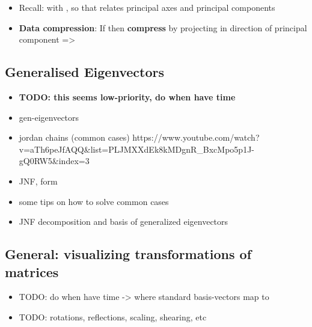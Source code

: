 \begin{itemize}
            \begin{itemize}

                  \item
                        Recall:
                        with , so that
                        relates principal axes and principal components
                  \item
                        \textbf{Data compression}: If 
                        then \textbf{compress}  by projecting in direction of
                        principal component =\textgreater{}
            \end{itemize}
\end{itemize}

\subsection*{Generalised Eigenvectors}

\begin{itemize}

      \item
            \textbf{TODO: this seems low-priority, do when have time}
      \item
            gen-eigenvectors
      \item
            jordan chains (common cases)
            https://www.youtube.com/watch?v=aTh6peJfAQQ\&list=PLJMXXdEk8kMDgnR\_BxcMpo5p1J-gQ0RW5\&index=3
      \item
            JNF, form
      \item
            some tips on how to solve common cases
      \item
            JNF decomposition and basis of generalized eigenvectors
\end{itemize}

\subsection*{General: visualizing transformations of
      matrices}

\begin{itemize}

      \item
            TODO: do when have time -\textgreater{} where standard basis-vectors
            map to
      \item
            TODO: rotations, reflections, scaling, shearing, etc
\end{itemize}
